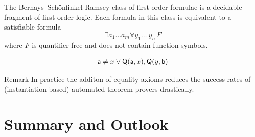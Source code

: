 \begin{frame}
		
		
		
		\begin{block}{}
			The Bernays–Schönfinkel-Ramsey class of first-order formulae is a decidable fragment of first-order logic.
			Each formula in this class is equivalent to a satisfiable formula
			\[\exists a_1\ldots a_m \forall y_1\ldots\ y_n\,F\] 
			where $F$ is quantifier free and does not contain function symbols.
			
			
		\end{block}
		
		\begin{example}
			\vspace{-1em}
			\begin{gather*}
				{\mathsf a}\neq x\lor{\mathsf Q}({\mathsf a},x), {\mathsf Q}(y,{\mathsf b})
			\end{gather*}
		\end{example}
		
		\begin{block}{Remark}
			In practice the additon of equality axioms reduces the success rates of (instantiation-based) automated theorem provers drastically.
			\end{block}
		
	\end{frame}

\section{Summary and Outlook}



